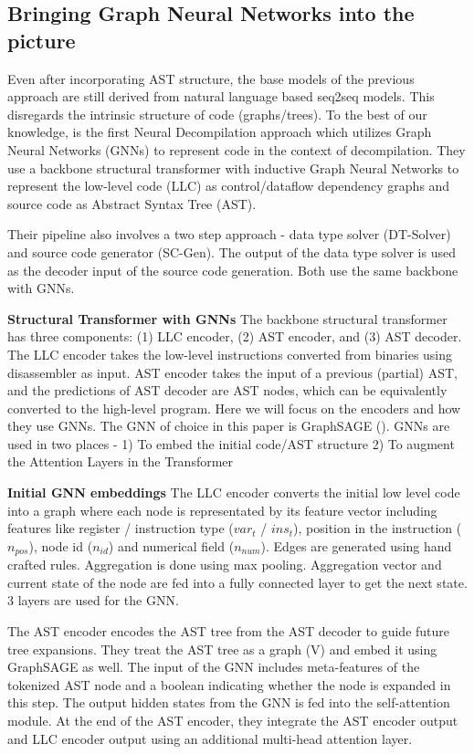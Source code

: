 \documentclass{article}
\begin{document}
\subsection{Bringing Graph Neural Networks into the picture}
Even after incorporating AST structure, the base models of the previous approach are still derived from natural language based seq2seq models. This disregards the intrinsic structure of code (graphs/trees). To the best of our knowledge, \cite{nbref} is the first Neural Decompilation approach which utilizes Graph Neural Networks (GNNs) to represent code in the context of decompilation. They use a backbone structural transformer \cite{vaswani2017attention} with inductive Graph Neural Networks \cite{hamilton2017inductive} to represent the low-level code (LLC) as control/dataflow dependency graphs and source code as Abstract Syntax Tree (AST).

Their pipeline also involves a two step approach - data type solver (DT-Solver) and source code generator (SC-Gen). The output of the data type solver is used as the decoder input of the source
code generation. Both use the same backbone with GNNs.

\textbf{Structural Transformer with GNNs}
The backbone structural transformer has three components: (1) LLC encoder, (2) AST encoder, and (3) AST decoder. The LLC encoder takes the low-level instructions converted from binaries using disassembler as input. AST encoder takes the input of a previous (partial) AST, and the predictions of AST decoder are AST nodes, which can be equivalently converted to the high-level program. Here we will focus on the encoders and how they use GNNs. The GNN of choice in this paper is GraphSAGE (\citet{hamilton2017inductive}). GNNs are used in two places - 1) To embed the initial code/AST structure 2) To augment the Attention Layers in the Transformer



\textbf{Initial GNN embeddings}
The LLC encoder converts the initial low level code into a graph where each node is representated by its feature vector including features like register / instruction type ($var_t$
/ $ins_t$), position in the instruction ($n_{pos}$), node id ($n_{id}$) and numerical field ($n_{num}$). Edges are generated using hand crafted rules. Aggregation is done using max pooling. Aggregation vector and current state of the node are fed into a fully connected layer to get the next state. 3 layers are used for the GNN.

The AST encoder encodes the AST tree from the AST decoder to guide future
tree expansions. They treat the AST tree as a graph (V) and embed it using GraphSAGE as well. The input of the GNN includes meta-features of the tokenized AST node and a boolean indicating whether the node is expanded in this step. The output hidden states from the GNN is fed into the self-attention module. At the end of the AST encoder, they integrate the AST encoder output and LLC encoder output using an additional multi-head attention layer.
\end{document}
